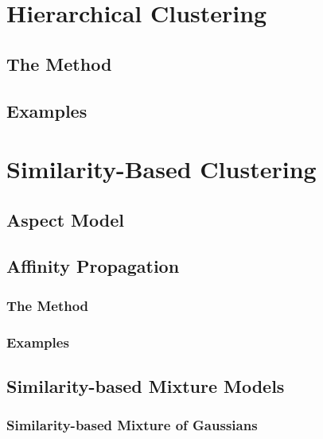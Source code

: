 \documentclass[11pt, oneside]{book}
\begin{document}

\section{Hierarchical Clustering}

\subsection{The Method}


\subsection{Examples}


\section{Similarity-Based Clustering}

\subsection{Aspect Model}


\subsection{Affinity Propagation}

\subsubsection{The Method}


\subsubsection{Examples}


\subsection{Similarity-based Mixture Models}

\subsubsection{Similarity-based Mixture of Gaussians}
\end{document}
